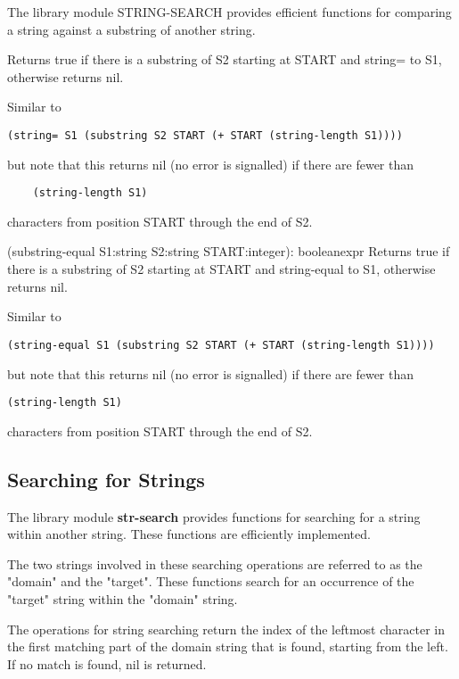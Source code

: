   The library module STRING-SEARCH provides efficient  functions
for comparing a string against a substring of another string.

 { Returns true if there is a substring of S2
starting at START and string= to S1, otherwise returns nil. }

    Similar to

\begin{verbatim}
(string= S1 (substring S2 START (+ START (string-length S1))))
\end{verbatim}
    but  note  that  this returns nil (no error is signalled) if
    there are fewer than

\begin{verbatim}
    (string-length S1)
\end{verbatim}
    characters from position START through the end of S2.

{(substring-equal S1:string S2:string START:integer): boolean}{expr}
{   
    Returns true if there is a substring of S2 starting at START
    and string-equal to S1, otherwise returns nil.
}

Similar to

\begin{verbatim}
(string-equal S1 (substring S2 START (+ START (string-length S1))))
\end{verbatim}
    but note that this returns nil (no error  is  signalled)  if
    there are fewer than

\begin{verbatim}
(string-length S1)
\end{verbatim}
    characters from position START through the end of S2.

\subsection{Searching for Strings}

The library module {\bf str-search} provides functions for
searching for a string within another string.   These  functions
are efficiently implemented.

  The  two  strings  involved  in these searching operations are
referred to as the "domain" and the "target".   These  functions
search  for  an  occurrence  of  the  "target" string within the
"domain" string.

  The operations for string searching return the  index  of  the
leftmost  character  in  the  first  matching part of the domain
string that is found, starting from the left.  If  no  match  is
found, nil is returned.

